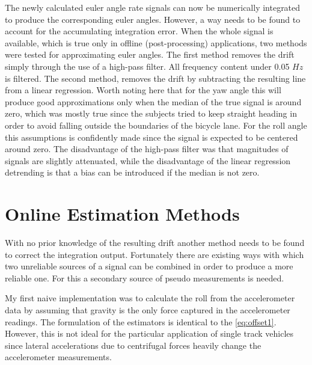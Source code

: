 The newly calculated  euler angle rate signals can now be numerically integrated to produce the corresponding euler angles. However, a way needs to be found to account for the accumulating integration error. When the whole signal is available, which is true only in offline (post-processing) applications, two methods were tested for approximating euler angles.  The first method removes the drift simply through the use of a high-pass filter. All frequency content under 0.05 \ensuremath{\si{Hz}} is filtered. The second method,  removes the drift  by subtracting the resulting line from a linear regression. Worth noting here that for the yaw angle this will produce good approximations only when the median of the true signal is around zero, which was mostly true since the subjects tried to keep straight heading in order to avoid falling outside the boundaries of the bicycle lane. For the roll angle this assumptions is confidently made since the signal is expected to be centered around zero. The disadvantage of the high-pass filter was that magnitudes of signals are slightly attenuated, while the disadvantage of the linear regression detrending is that a bias can be introduced if the median is not zero.

\section{Online Estimation Methods}

With no prior knowledge of the resulting drift another method needs to be found  to correct the integration output. Fortunately there are existing ways with which two unreliable sources of a signal can be combined in order to produce a more reliable one. For this a secondary source of pseudo measurements is needed. 

My first naive implementation was to calculate the roll  from the accelerometer data by assuming that gravity is the only force captured in the accelerometer readings. The formulation of the estimators is identical to the \cref{eq:offset1}. However, this is not ideal for the particular application of single track vehicles since lateral accelerations due to centrifugal forces heavily change the accelerometer measurements. 

